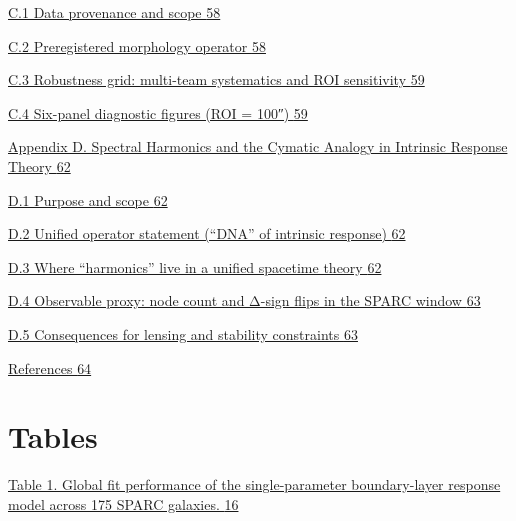 \hyperref[c.1-data-provenance-and-scope]{C.1 Data provenance and scope \hyperref[c.1-data-provenance-and-scope]{58}}

\hyperref[c.2-preregistered-morphology-operator]{C.2 Preregistered morphology operator \hyperref[c.2-preregistered-morphology-operator]{58}}

\hyperref[c.3-robustness-grid-multi-team-systematics-and-roi-sensitivity]{C.3 Robustness grid: multi-team systematics and ROI sensitivity \hyperref[c.3-robustness-grid-multi-team-systematics-and-roi-sensitivity]{59}}

\hyperref[c.4-six-panel-diagnostic-figures-roi-100]{C.4 Six-panel diagnostic figures (ROI = 100″) \hyperref[c.4-six-panel-diagnostic-figures-roi-100]{59}}

\hyperref[appendix-d.-spectral-harmonics-and-the-cymatic-analogy-in-intrinsic-response-theory]{Appendix D. Spectral Harmonics and the Cymatic Analogy in Intrinsic Response Theory \hyperref[appendix-d.-spectral-harmonics-and-the-cymatic-analogy-in-intrinsic-response-theory]{62}}

\hyperref[d.1-purpose-and-scope]{D.1 Purpose and scope \hyperref[d.1-purpose-and-scope]{62}}

\hyperref[d.2-unified-operator-statement-dna-of-intrinsic-response]{D.2 Unified operator statement (``DNA'' of intrinsic response) \hyperref[d.2-unified-operator-statement-dna-of-intrinsic-response]{62}}

\hyperref[d.3-where-harmonics-live-in-a-unified-spacetime-theory]{D.3 Where ``harmonics'' live in a unified spacetime theory \hyperref[d.3-where-harmonics-live-in-a-unified-spacetime-theory]{62}}

\hyperref[d.4-observable-proxy-node-count-and-ux3b4-sign-flips-in-the-sparc-window]{D.4 Observable proxy: node count and Δ-sign flips in the SPARC window \hyperref[d.4-observable-proxy-node-count-and-ux3b4-sign-flips-in-the-sparc-window]{63}}

\hyperref[d.5-consequences-for-lensing-and-stability-constraints]{D.5 Consequences for lensing and stability constraints \hyperref[d.5-consequences-for-lensing-and-stability-constraints]{63}}

\hyperref[references]{References \hyperref[references]{64}}

\section{Tables}\label{tables}

\hyperref[_Toc222952631]{Table 1. Global fit performance of the single-parameter boundary-layer response model across 175 SPARC galaxies. \hyperref[_Toc222952631]{16}}

